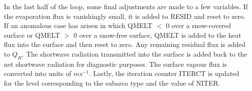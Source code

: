 In the last half of the loop, some final adjustments are made to a few variables. If the evaporation flux is vanishingly small, it is added to R\+E\+S\+I\+D and reset to zero. If an anomalous case has arisen in which Q\+M\+E\+L\+T $<$ 0 over a snow-\/covered surface or Q\+M\+E\+L\+T $>$ 0 over a snow-\/free surface, Q\+M\+E\+L\+T is added to the heat flux into the surface and then reset to zero. Any remaining residual flux is added to $Q_H$. The shortwave radiation transmitted into the surface is added back to the net shortwave radiation for diagnostic purposes. The surface vapour flux is converted into units of $m s^{-1}$. Lastly, the iteration counter I\+T\+E\+R\+C\+T is updated for the level corresponding to the subarea type and the value of N\+I\+T\+E\+R.